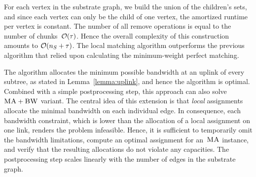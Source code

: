  For each
vertex in the substrate graph,
we build the union of the
children's sets,
and since each vertex can only be the child of one vertex,
the amortized runtime per vertex is constant.
The number of all remove operations is equal to
the number of chunks~$\mathcal{O}(\tau)$.
Hence the overall complexity of this construction amounts to
$\mathcal{O}(n_S + \tau)$.
The local matching algorithm outperforms the previous algorithm that relied upon calculating the minimum-weight perfect matching.


%

The algorithm allocates the minimum possible bandwidth at an uplink of every subtree, as stated in Lemma~\ref{lemma:uplink}, and hence the algorithm is optimal.
Combined with a simple postprocessing step, this approach can also solve~$\textsc{MA}+\textsc{BW}$ variant. The central idea of this extension is
that \emph{local} assignments allocate the minimal bandwidth
on each individual edge. In consequence, each bandwidth constraint,
which is lower than the allocation of a local assignment on one link, renders
the problem infeasible. Hence, it is sufficient to temporarily omit the
bandwidth limitations, compute an optimal assignment for an~$\textsc{MA}$ instance, and
verify that the resulting allocations do not violate any capacities. The
postprocessing step scales linearly with the number of edges in the substrate
graph.


